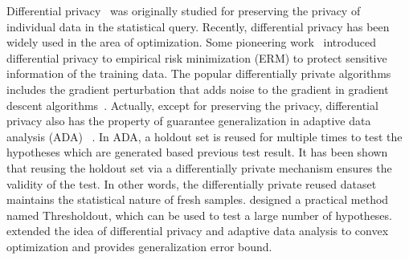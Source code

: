 \documentclass[11pt]{article}
\begin{document}
Differential privacy~\cite{dwro2014} was originally studied for preserving the privacy of individual data in the statistical query. Recently, differential privacy has been widely used in the area of optimization. Some pioneering work~\citep{chmo2011, basm2014, waye2017} introduced differential privacy to empirical risk minimization (ERM) to protect sensitive information of the training data. The popular differentially private
algorithms includes the gradient perturbation that adds noise to the gradient in gradient descent algorithms~\citep{chmo2011,basm2014,waxu2019}.
Actually, except for preserving the privacy, differential privacy also has the property of guarantee generalization in adaptive data analysis (ADA) ~\cite{dwfe2015a,dwfe2015b,dwfe2015c}. In ADA, a holdout set is reused for multiple times to test the hypotheses which are generated based previous test result.  It has been shown that reusing the holdout set via a differentially private mechanism ensures the validity of the test. In other words, the differentially private reused dataset maintains the statistical nature of fresh samples. 
\citet{dwfe2015a, dwfe2015b, dwfe2015c} designed a practical method named Thresholdout, which can be used to test a large number of hypotheses. 
\citet{zhch2018} extended the idea of differential privacy and adaptive data analysis to convex optimization and provides generalization error bound.
\end{document}
